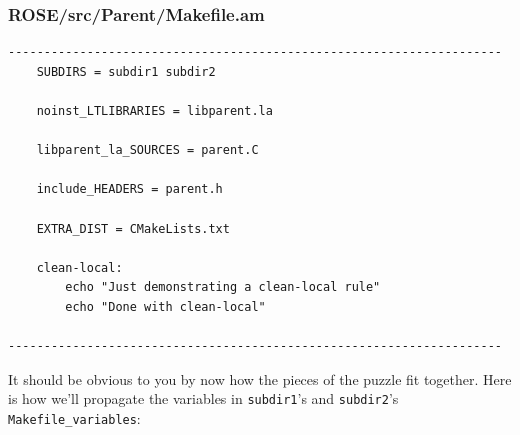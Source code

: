 \subsubsection{ROSE/src/Parent/Makefile.am}
    \begin{verbatim}
---------------------------------------------------------------------
    SUBDIRS = subdir1 subdir2

    noinst_LTLIBRARIES = libparent.la

    libparent_la_SOURCES = parent.C

    include_HEADERS = parent.h

    EXTRA_DIST = CMakeLists.txt

    clean-local:
        echo "Just demonstrating a clean-local rule"
        echo "Done with clean-local"

---------------------------------------------------------------------
    \end{verbatim}
It should be obvious to you by now how the pieces of the puzzle fit together. Here is how
we'll propagate the variables in \texttt{subdir1}'s and \texttt{subdir2}'s
\texttt{Makefile\_variables}:

